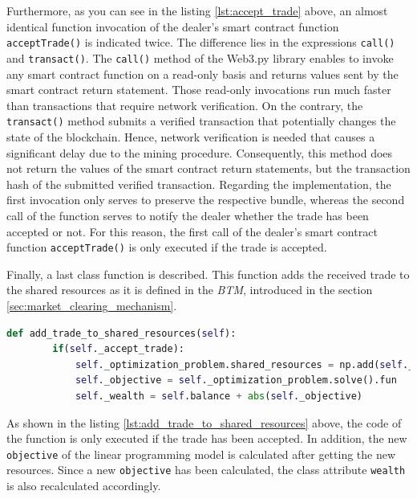 Furthermore, as you can see in the listing \ref{lst:accept_trade} above, an almost 
identical function invocation of the dealer's smart contract 
function \verb|acceptTrade()| is indicated twice. 
The difference lies in the expressions \verb|call()| and \verb|transact()|. 
The \verb|call()| method of the Web3.py library enables to invoke any smart contract function on a read-only basis
and returns values sent by the smart contract return statement. 
Those read-only invocations run much faster than transactions that require network verification.
On the contrary, the \verb|transact()| method submits a verified transaction that potentially changes the state of the blockchain. 
Hence, network verification is needed that causes a significant delay due to the mining procedure.
Consequently, this method does not return the values of the smart contract return statements,
but the transaction hash of the submitted verified transaction.
Regarding the implementation, the first invocation only serves to preserve the respective bundle,
whereas the second call of the function serves to notify the dealer whether the trade has been accepted or not.
For this reason, the first call of the dealer's smart contract function \verb|acceptTrade()| 
is only executed if the trade is accepted. 

Finally, a last class function is described. This function adds the received trade to the shared resources
as it is defined in the \textit{BTM}, introduced in the section \ref{sec:market_clearing_mechanism}.

\begin{lstlisting}[float=htbp, label=lst:add_trade_to_shared_resources, caption=Adding of trade to shared resources, language=Python]
    def add_trade_to_shared_resources(self):
        if(self._accept_trade):
            self._optimization_problem.shared_resources = np.add(self._optimization_problem.shared_resources, self._trade)
            self._objective = self._optimization_problem.solve().fun  
            self._wealth = self.balance + abs(self._objective)
\end{lstlisting}

As shown in the listing \ref{lst:add_trade_to_shared_resources} above, the code of the function 
is only executed if the trade has been accepted. 
In addition, the new \verb|objective| of the linear programming model is calculated after getting the new resources.
Since a new \verb|objective| has been calculated, the class attribute \verb|wealth| is also recalculated accordingly.



